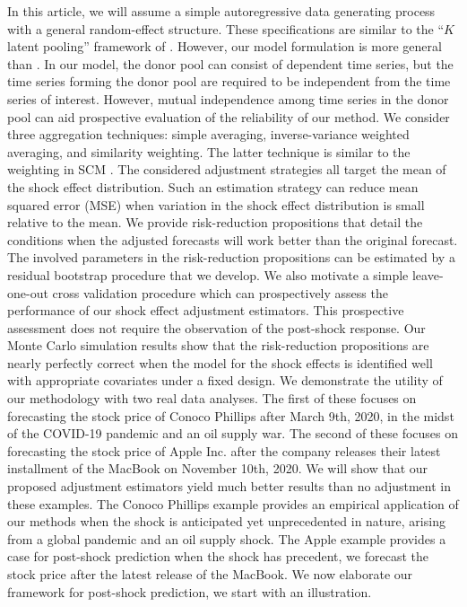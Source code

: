 \documentclass[11pt,3p,review,authoryear]{elsarticle}
\theoremstyle{definition}
\begin{document}
In this article, we will assume a simple autoregressive data generating process  with a general random-effect structure. These specifications are similar to the ``$K$ latent pooling'' framework of \cite{ramaswamy1993empirical}. However, our model formulation is more general than \cite{ramaswamy1993empirical}. In our model, the donor pool can consist of dependent time series, but the time series forming the donor pool are required to be independent from the time series of interest. However, mutual independence among time series in the donor pool can aid prospective evaluation of the reliability of our method. We consider three aggregation techniques: simple averaging, inverse-variance weighted averaging, and similarity weighting. The latter technique is similar to the weighting in SCM \citep{abadie2010synthetic}. The considered adjustment strategies all target the mean of the shock effect distribution. Such an estimation strategy can reduce mean squared error (MSE) when variation in the shock effect distribution is small relative to the mean. We provide risk-reduction propositions that detail the conditions when the adjusted forecasts will work better than the original forecast. The involved parameters in the risk-reduction propositions can be estimated by a residual bootstrap procedure that we develop. We also motivate a simple leave-one-out cross validation procedure which can prospectively assess the performance of our shock effect adjustment estimators. This prospective assessment does not require the observation of the post-shock response. Our Monte Carlo simulation results show that the risk-reduction propositions are nearly perfectly correct when the model for the shock effects is identified well with appropriate covariates under a fixed design.  We demonstrate the utility of our methodology with two real data analyses. The first of these focuses on forecasting the stock price of Conoco Phillips after March 9th, 2020, in the midst of the COVID-19 pandemic and an oil supply war. The second of these focuses on forecasting the stock price of Apple Inc. after the company releases their latest installment of the MacBook on November 10th, 2020. We will show that our proposed adjustment estimators yield much better results than no adjustment in these examples. The Conoco Phillips example provides an empirical application of our methods when the shock is anticipated yet unprecedented in nature, arising from a global pandemic and an oil supply shock. The Apple example provides a case for post-shock prediction when the shock has precedent, we forecast the stock price after the latest release of the MacBook. We now elaborate our framework for post-shock prediction, we start with an illustration.
\end{document}
